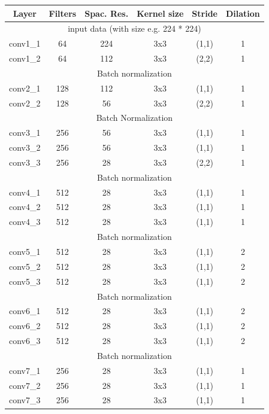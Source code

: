 \documentclass[twoside,twocolumn]{article}
\begin{document}
\begin{table}
\centering
{}
\label{tab:network}
\begin{tabular}{|c|c|c|c|c|c|}
	\hline
	\hline
	Layer & Filters & Spac. Res. & Kernel size & Stride & Dilation\\ 
	\hline
	\hline
	\multicolumn{6}{|c|}{input data (with size e.g. 224 * 224)}\\ \hline
	conv1\_1 & 64 & 224 & 3x3 & (1,1) & 1 \\ \hline
	conv1\_2 & 64 & 112 & 3x3 & (2,2) & 1 \\ \hline
	\multicolumn{6}{|c|}{Batch normalization}\\ \hline
	conv2\_1 & 128 & 112 & 3x3 & (1,1) & 1 \\ \hline
	conv2\_2 & 128 & 56 & 3x3 & (2,2) & 1 \\ \hline
	\multicolumn{6}{|c|}{Batch Normalization}\\ \hline
	conv3\_1 & 256 & 56 & 3x3 & (1,1) & 1 \\ \hline
	conv3\_2 & 256 & 56 & 3x3 & (1,1) & 1 \\ \hline
	conv3\_3 & 256 & 28 & 3x3 & (2,2) & 1 \\ \hline
	\multicolumn{6}{|c|}{Batch normalization}\\ \hline
	conv4\_1 & 512 & 28 & 3x3 & (1,1) & 1 \\ \hline
	conv4\_2 & 512 & 28 & 3x3 & (1,1) & 1 \\ \hline
	conv4\_3 & 512 & 28 & 3x3 & (1,1) & 1 \\ \hline
	\multicolumn{6}{|c|}{Batch normalization}\\ \hline
	conv5\_1 & 512 & 28 & 3x3 & (1,1) & 2 \\ \hline
	conv5\_2 & 512 & 28 & 3x3 & (1,1) & 2 \\ \hline
	conv5\_3 & 512 & 28 & 3x3 & (1,1) & 2 \\ \hline
	\multicolumn{6}{|c|}{Batch normalization}\\ \hline
	conv6\_1 & 512 & 28 & 3x3 & (1,1) & 2 \\ \hline
	conv6\_2 & 512 & 28 & 3x3 & (1,1) & 2 \\ \hline
	conv6\_3 & 512 & 28 & 3x3 & (1,1) & 2 \\ \hline
	\multicolumn{6}{|c|}{Batch normalization}\\ \hline
	conv7\_1 & 256 & 28 & 3x3 & (1,1) & 1 \\ \hline
	conv7\_2 & 256 & 28 & 3x3 & (1,1) & 1 \\ \hline
	conv7\_3 & 256 & 28 & 3x3 & (1,1) & 1 \\ \hline

\end{tabular}
\end{table}
\end{document}

